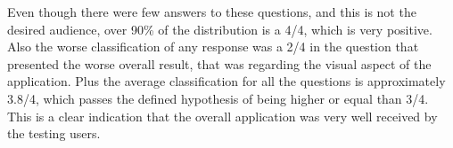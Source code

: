 Even though there were few answers to these questions, and this is not the desired audience, over 90\% of the distribution is a 4/4, which is very positive.
Also the worse classification of any response was a 2/4 in the question that presented the worse overall result, that was regarding the visual aspect of the application.
Plus the average classification for all the questions is approximately 3.8/4, which passes the defined hypothesis of being higher or equal than 3/4.
This is a clear indication that the overall application was very well received by the testing users.

